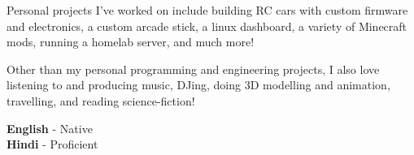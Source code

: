 \documentclass[9pt]{developercv} %
\begin{document}
\vspace{1em}



\vspace{4em}

\begin{minipage}[t]{0.3\textwidth}
	\vspace{-\baselineskip} %


	Personal projects I've worked on include building RC cars with custom firmware and electronics, a custom arcade stick, a linux dashboard, a variety of Minecraft mods, running a homelab server, and much more!
\end{minipage}
\hfill
\begin{minipage}[t]{0.3\textwidth}
	\vspace{-\baselineskip} %


	Other than my personal programming and engineering projects, I also love listening to and producing music, DJing, doing 3D modelling and animation, travelling, and reading science-fiction!
\end{minipage}
\hfill
\begin{minipage}[t]{0.3\textwidth}
	\vspace{-\baselineskip} %


	\textbf{English} - Native \\
	\textbf{Hindi} - Proficient \\
\end{minipage}

\pagebreak
{}
\end{document}
